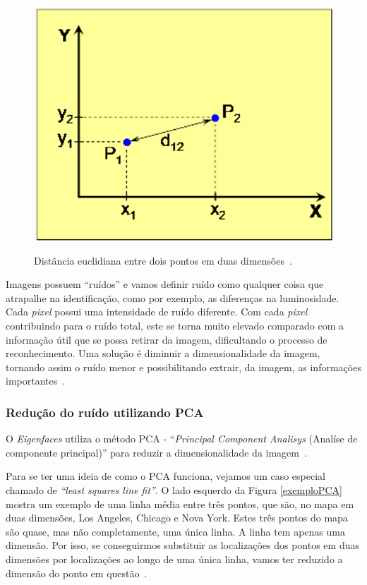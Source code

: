     \begin{figure}[hbt]
		\begin{center}
			\includegraphics[height=9.5cm,width=12.5cm]{figuras/2.FundamentacaoTeorica/graficoDistanciaEntrePontos.png}
		\end{center}
		\caption{Distância euclidiana entre dois pontos em duas dimensões~\cite{hewitt}.}
		\label{distanciaEntrePontos}
	\end{figure}


Imagens possuem ``ruídos'' e vamos definir ruído como qualquer coisa que atrapalhe na identificação, como por exemplo, as diferenças na luminosidade. Cada \textit{pixel} possui uma intensidade de ruído diferente. Com cada \textit{pixel} contribuindo para o ruído total, este se torna muito elevado comparado com a informação útil que se possa retirar da imagem, dificultando o processo de reconhecimento. Uma solução é diminuir a dimensionalidade da imagem, tornando assim o ruído menor e possibilitando extrair, da imagem, as informações importantes~\cite{hewitt}.

\subsubsection{Redução do ruído utilizando PCA}

O \textit{Eigenfaces} utiliza o método PCA - ``\textit{Principal Component Analisys} (Analíse de componente principal)'' para reduzir a dimensionalidade da imagem~\cite{hewitt}.

Para se ter uma ideia de como o PCA funciona, vejamos um caso especial chamado de \textit{``least squares line fit''}. O lado esquerdo da Figura \ref{exemploPCA} mostra um exemplo de uma linha média entre três pontos, que são, no mapa em duas dimensões, Los Angeles, Chicago e Nova York. Estes três pontos do mapa são quase, mas não completamente, uma única linha. A linha tem apenas uma dimensão. Por isso, se conseguirmos substituir as localizações dos pontos em duas dimensões por localizações ao longo de uma única linha, vamos ter reduzido a dimensão do ponto em questão~\cite{hewitt}.

